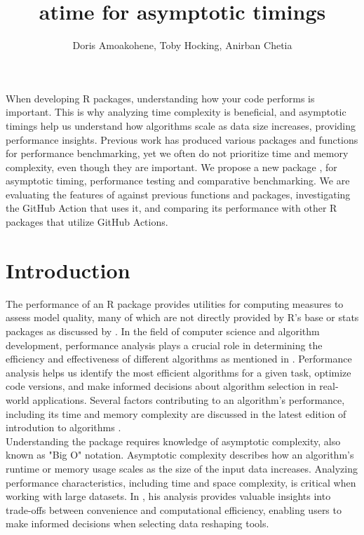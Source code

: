 \title{atime for asymptotic timings }
\author{Doris Amoakohene, Toby Hocking, Anirban Chetia}

\maketitle

\abstract{}
When developing R packages, understanding how your code performs is important. This is why analyzing time complexity is beneficial, and asymptotic timings help us understand how algorithms scale as data size increases, providing performance insights. Previous work has produced various packages and functions for performance benchmarking, yet we often do not prioritize time and memory complexity, even though they are important.
We propose a new package  , for asymptotic timing, performance testing and comparative benchmarking. We are evaluating the features of  against previous functions and packages, investigating the GitHub Action that uses it, and comparing its performance with other R packages that utilize GitHub Actions. 

\section{Introduction}
The performance of an R package provides utilities for computing measures to assess model quality, many of which are not directly provided by R's base or stats packages as discussed by \cite{system.time}. In the field of computer science and algorithm development, performance analysis plays a crucial role in determining the efficiency and effectiveness of different algorithms as mentioned in \cite{knuth1997art}. Performance analysis helps us identify the most efficient algorithms for a given task, optimize code versions, and make informed decisions about algorithm selection in real-world applications. Several factors contributing to an algorithm's performance, including its time and memory complexity are discussed in the latest edition of introdution to algorithms \cite{cormen2022introduction}.\\

\noindent Understanding the  package requires knowledge of asymptotic complexity, also known as "Big O" notation. Asymptotic complexity describes how an algorithm's runtime or memory usage scales as the size of the input data increases. Analyzing performance characteristics, including time and space complexity, is critical when working with large datasets. In \cite{Hocking2021}, his analysis provides valuable insights into trade-offs between convenience and computational efficiency, enabling users to make informed decisions when selecting data reshaping tools.
 
